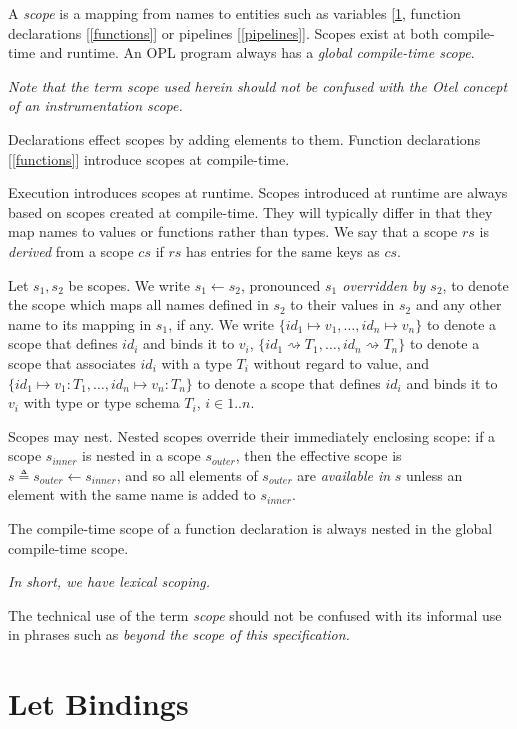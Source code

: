 \documentclass{article}
\begin{document}
A {\em scope} is a mapping from names to entities such as variables [\ref{letBindings}, function declarations [\ref{functions}] or pipelines [\ref{pipelines}]. Scopes exist at both compile-time and runtime. An OPL program always has a {\em global compile-time scope}.

{\em 
Note that the term scope used herein should not be confused with the Otel concept of an instrumentation scope. 
}


Declarations effect scopes by adding elements to them. 
Function declarations [\ref{functions}] introduce scopes at compile-time. 

Execution introduces scopes at runtime. Scopes introduced at runtime are always based on scopes created at compile-time. They will typically differ in that they map names to values or functions rather than types. We say that a scope $rs$ is {\em derived} from a scope $cs$ if $rs$ has entries for the same keys as $cs$.

Let $s_1, s_2$ be scopes.  We write $s_1 \leftarrow s_2$, pronounced {\em $s_1$ overridden by $s_2$}, to denote the scope  which maps all names defined in $s_2$ to their values in $s_2$ and any other name to its mapping in $s_1$, if any. We write $\{id_1 \mapsto v_1, \ldots, id_n \mapsto v_n\}$ to denote a scope that defines $id_i$ and binds it to $v_i$,  $\{id_1 \rightsquigarrow  T_1, \ldots, id_n \rightsquigarrow T_n\}$ to denote a scope that associates $id_i$ with a type $T_i $ without regard to value, and  $\{id_1 \mapsto v_1: T_1, \ldots, id_n \mapsto  v_n: T_n\}$ to denote a scope that defines $id_i$ and binds it to $v_i$ with type or type schema $T_i$, $i \in 1..n$.

Scopes may nest. Nested scopes override their immediately enclosing scope: if a scope $s_{inner}$ is nested in a scope $s_{outer}$, then the effective scope is $s \triangleq s_{outer} \leftarrow s_{inner}$, and so all elements of $s_{outer}$ are {\em available in} $s$ unless an element with the same name is added to $s_{inner}$. 

The compile-time scope of a function declaration is always nested in the global compile-time scope.  

{\em
In short, we have lexical scoping.
}

The technical use of the term {\em scope} should not be confused with its informal use in phrases such as {\em beyond the scope of this specification.}

\section{Let Bindings}
\label{letBindings}
\end{document}
